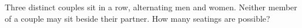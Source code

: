 Three distinct couples sit in a row, alternating men and women. Neither member of a couple may sit beside their partner. How many seatings are possible?
